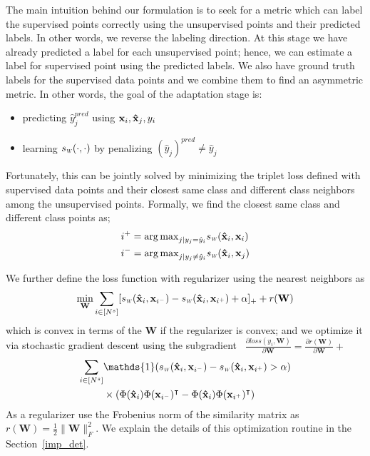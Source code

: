 The main intuition behind our formulation is to seek for a metric which can label the supervised points correctly using the unsupervised points and their predicted labels. In other words, we reverse the labeling direction. At this stage we have already predicted a label for each unsupervised point; hence, we can estimate a label for supervised point using the predicted labels. We also have ground truth labels for the supervised data points and we combine them to find an asymmetric metric. In other words, the goal of the adaptation stage is:

\vspace{-3mm}
\begin{itemize}
\item predicting $\hat{y}^{pred}_j$ using $\mathbf{x}_i, \mathbf{\hat{x}}_j, y_i$
\item learning $\sw(\cdot,\cdot)$ by penalizing  $(\hat{y}_j)^{pred} \neq \hat{y}_j$ 
\end{itemize}

Fortunately, this can be jointly solved by minimizing the triplet loss defined with supervised data points and their closest same class and different class neighbors among the unsupervised points. Formally, we find the closest same class and different class points as;
\begin{equation}
\begin{aligned}
&i^{+} = {\arg\max}_{j | y_j = \hat{y}_i} \sw(\xsi, \xui) \\
&i^{-} = {\arg\max}_{j | y_j \neq \hat{y}_i} \sw(\xsi,\xuj) 
\label{sup_nn}
\end{aligned}
\end{equation}

We further define the loss function with regularizer using the nearest neighbors as
\begin{equation}
\min_{\mathbf{W}} \sum_{i \in [N^s]} [\sw(\mathbf{\hat{x}}_i,\mathbf{x}_{i^-}) - \sw(\mathbf{\hat{x}}_i,\mathbf{x}_{i^+}) + \alpha]_{+} + r(\mathbf{W})
\end{equation}
which is convex in terms of the $\mathbf{W}$ if the regularizer is convex; and we optimize it via stochastic gradient descent using the subgradient \
\mbox{$\frac{\partial loss (y_i, \mathbf{W})}{\partial \mathbf{W}} = \frac{\partial r ( \mathbf{W})}{\partial \mathbf{W}} + $}
\begin{equation}
\begin{aligned}
\sum_{i \in [N^s]} &\mathds{1}(\sw(\xsi,\mathbf{x}_{i^-}) - \sw(\xsi,\mathbf{x}_{i^+})>\alpha) \\
&\times \left( \Phi(\xsi)\Phi(\mathbf{x}_{i^-})^\intercal - \Phi(\xsi)\Phi(\mathbf{x}_{i^+})^\intercal  \right)  
\end{aligned}
\label{gradw}
\end{equation}
As a regularizer use the Frobenius norm of the similarity matrix as $r(\mathbf{W})=\frac{1}{2}\|\mathbf{W}\|_F^2$. We explain the details of this optimization routine in the Section~\ref{imp_det}.
